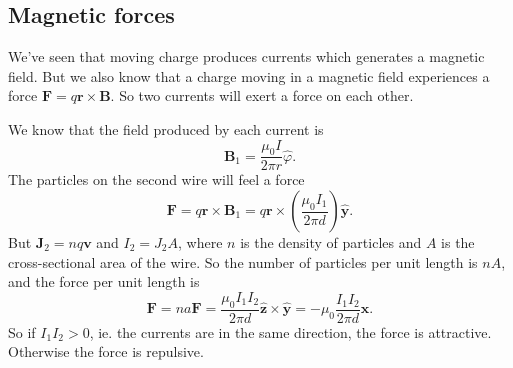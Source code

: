 \documentclass[a4paper]{article}
\begin{document}
\subsection{Magnetic forces}
We've seen that moving charge produces currents which generates a magnetic field. But we also know that a charge moving in a magnetic field experiences a force $\mathbf{F} = q\mathbf{r}\times \mathbf{B}$. So two currents will exert a force on each other.

\begin{eg}\leavevmode
  \begin{center}
  \end{center}
  We know that the field produced by each current is
  \[
    \mathbf{B}_1 = \frac{\mu_0 I}{2\pi r}\hat{\varphi}.
  \]
  The particles on the second wire will feel a force
  \[
    \mathbf{F} = q\mathbf{r}\times \mathbf{B}_1 = q\mathbf{r}\times \left(\frac{\mu_0 I_1}{2\pi d}\right) \hat{\mathbf{y}}.
  \]
  But $\mathbf{J}_2 = nq\mathbf{v}$ and $I_2 = J_2 A$, where $n$ is the density of particles and $A$ is the cross-sectional area of the wire. So the number of particles per unit length is $nA$, and the force per unit length is
  \[
    \mathbf{F} = na\mathbf{F} = \frac{\mu_0 I_1I_2}{2\pi d}\hat{\mathbf{z}}\times \hat{\mathbf{y}} = -\mu_0\frac{I_1I_2}{2\pi d}\hat{\mathbf{x}}.
  \]
  So if $I_1I_2 > 0$, ie. the currents are in the same direction, the force is attractive. Otherwise the force is repulsive.
\end{eg}
\end{document}
